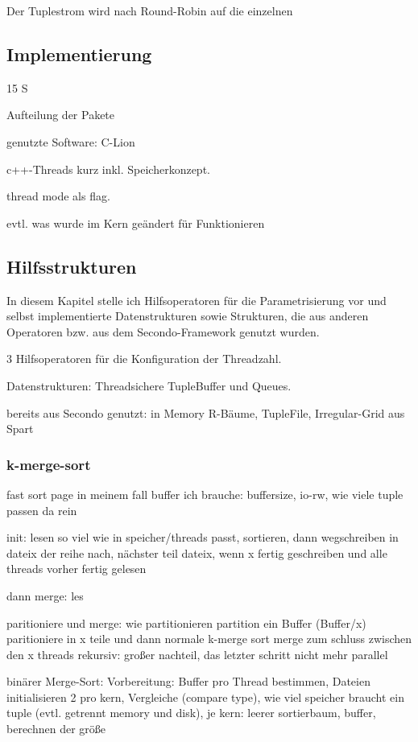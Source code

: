 \documentclass[a4paper,12pt,twoside]{article}
\begin{document}
Der Tuplestrom wird nach Round-Robin auf die einzelnen 

\subsection{Implementierung} 15 S

Aufteilung der Pakete

genutzte Software: C-Lion

c++-Threads kurz inkl. Speicherkonzept.

thread mode als flag.

evtl. was wurde im Kern geändert für Funktionieren 

\subsection{Hilfsstrukturen}
In diesem Kapitel stelle ich Hilfsoperatoren für die Parametrisierung vor und selbst implementierte Datenstrukturen sowie Strukturen, die aus anderen Operatoren bzw. aus dem Secondo-Framework genutzt wurden.

3 Hilfsoperatoren für die Konfiguration der Threadzahl.

Datenstrukturen:
Threadsichere TupleBuffer und Queues. 

bereits aus Secondo genutzt: 
in Memory R-Bäume, TupleFile, Irregular-Grid aus Spart

\subsubsection{k-merge-sort}
fast sort
page in meinem fall buffer
ich brauche: buffersize, io-rw, wie viele tuple passen da rein

init: lesen so viel wie in speicher/threads passt, sortieren, dann wegschreiben in dateix der reihe nach, nächster teil dateix, wenn x fertig geschreiben und alle threads vorher fertig gelesen

dann merge: les

paritioniere und merge: wie partitionieren
partition ein Buffer (Buffer/x)
paritioniere in x teile und dann normale k-merge sort
merge zum schluss zwischen den x threads rekursiv: großer nachteil, das letzter schritt nicht mehr parallel

binärer Merge-Sort:
Vorbereitung: Buffer pro Thread bestimmen, Dateien initialisieren 2 pro kern, Vergleiche (compare type), wie viel speicher braucht ein tuple (evtl. getrennt memory und disk), 
je kern: leerer sortierbaum, buffer, berechnen der größe
\end{document}
